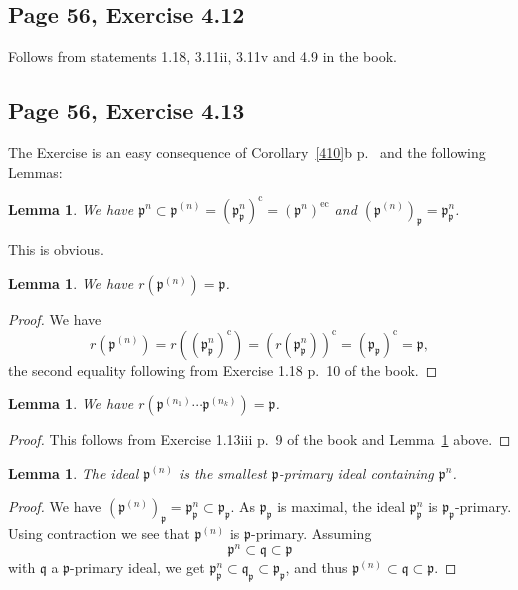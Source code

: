 \documentclass[parskip=half,fontsize=12pt]{scrartcl}%
\newcommand{\oo}{\operatorname}\newcommand{\ooo}{\operatorname*}
\newcommand{\mf}{\mathfrak}
\newcommand{\ppp}{\mf p}
\newcommand{\qqq}{\mf q}
\newtheorem{lem}[thm]{Lemma}
\begin{document}
\subsection{Page 56, Exercise 4.12}%

Follows from statements 1.18, 3.11ii, 3.11v and 4.9 in the book.

\subsection{Page 56, Exercise 4.13}%

The Exercise is an easy consequence of Corollary~\ref{410}b p.~\pageref{410} and the following Lemmas:

\begin{lem}
We have $\ppp^n\subset\ppp^{(n)}=\left(\ppp_\ppp^n\right)^{\oo c}=\left(\ppp^n\right)^{\oo{ec}}$ and $\left(\ppp^{(n)}\right)_\ppp=\ppp_\ppp^n$. 
\end{lem}
This is obvious.

\begin{lem}\label{413a}
We have $r\left(\ppp^{(n)}\right)=\ppp$. 
\end{lem}
\begin{proof}
We have 
$$
r\left(\ppp^{(n)}\right)=r\left(\left(\ppp_\ppp^n\right)^{\oo c}\right)=\left(r\left(\ppp_\ppp^n\right)\right)^{\oo c}=(\ppp_\ppp)^{\oo c}=\ppp,
$$ 
the second equality following from Exercise 1.18 p.~10 of the book. 
\end{proof} 

\begin{lem}
We have $r\left(\ppp^{(n_1)}\cdots\ppp^{(n_k)}\right)=\ppp$. 
\end{lem}
\begin{proof}
This follows from Exercise 1.13iii p.~9 of the book and Lemma~\ref{413a} above.
\end{proof}

\begin{lem}\label{413b}
The ideal $\ppp^{(n)}$ is the smallest $\ppp$-primary ideal containing $\ppp^n$. 
\end{lem}
\begin{proof}
We have $(\ppp^{(n)})_\ppp=\ppp_\ppp^{n}\subset\ppp_\ppp$. As $\ppp_\ppp$ is maximal, the ideal $\ppp^n_\ppp$ is $\ppp_\ppp$-primary. Using contraction we see that $\ppp^{(n)}$ is $\ppp$-primary. Assuming 
$$
\ppp^n\subset\qqq\subset\ppp
$$ 
with $\qqq$ a $\ppp$-primary ideal, we get $\ppp^n_\ppp\subset\qqq_\ppp\subset\ppp_\ppp$, and thus $\ppp^{(n)}\subset\qqq\subset\ppp$. 
\end{proof}
\end{document}

